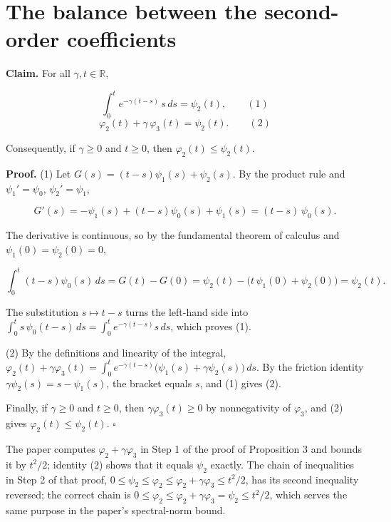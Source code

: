 \documentclass[11pt,a4paper]{article}
\begin{document}
\section{\texorpdfstring{The balance between the second-order coefficients}{The balance between the second-order coefficients}}


\textbf{Claim.} For all \(\gamma,t\in\mathbb R\),


\[\int_0^te^{-\gamma(t-s)}\,s\,ds=\psi_2(t),\qquad(1)\]
\[\varphi_2(t)+\gamma\,\varphi_3(t)=\psi_2(t).\qquad(2)\]


Consequently, if \(\gamma\ge0\) and \(t\ge0\), then \(\varphi_2(t)\le\psi_2(t)\).




\textbf{Proof.} (1) Let \(G(s)=(t-s)\psi_1(s)+\psi_2(s)\). By the product rule and \(\psi_1'=\psi_0\), \(\psi_2'=\psi_1\),


\[G'(s)=-\psi_1(s)+(t-s)\psi_0(s)+\psi_1(s)=(t-s)\,\psi_0(s).\]


The derivative is continuous, so by the fundamental theorem of calculus and \(\psi_1(0)=\psi_2(0)=0\),


\[\int_0^t(t-s)\psi_0(s)\,ds=G(t)-G(0)=\psi_2(t)-\bigl(t\,\psi_1(0)+\psi_2(0)\bigr)=\psi_2(t).\]


The substitution \(s\mapsto t-s\) turns the left-hand side into \(\int_0^ts\,\psi_0(t-s)\,ds=\int_0^te^{-\gamma(t-s)}s\,ds\), which proves (1).




(2) By the definitions and linearity of the integral, \(\varphi_2(t)+\gamma\varphi_3(t)=\int_0^te^{-\gamma(t-s)}\bigl(\psi_1(s)+\gamma\psi_2(s)\bigr)\,ds\). By the friction identity \(\gamma\psi_2(s)=s-\psi_1(s)\), the bracket equals \(s\), and (1) gives (2).




Finally, if \(\gamma\ge0\) and \(t\ge0\), then \(\gamma\varphi_3(t)\ge0\) by nonnegativity of \(\varphi_3\), and (2) gives \(\varphi_2(t)\le\psi_2(t)\). \(\square\)




The paper computes \(\varphi_2+\gamma\varphi_3\) in Step 1 of the proof of Proposition 3 and bounds it by \(t^2/2\); identity (2) shows that it equals \(\psi_2\) exactly. The chain of inequalities in Step 2 of that proof, \(0\le\psi_2\le\varphi_2\le\varphi_2+\gamma\varphi_3\le t^2/2\), has its second inequality reversed; the correct chain is \(0\le\varphi_2\le\varphi_2+\gamma\varphi_3=\psi_2\le t^2/2\), which serves the same purpose in the paper's spectral-norm bound.
\end{document}
